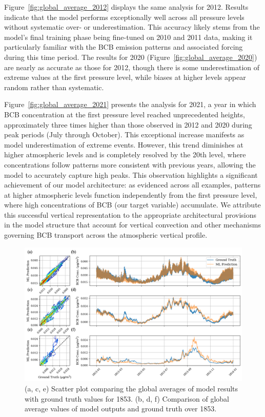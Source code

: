 \documentclass{article}
\begin{document}
    Figure~\ref{fig:global_average_2012} displays the same analysis for 2012. Results indicate that the model performs exceptionally well across all pressure levels without systematic over- or underestimation. This accuracy likely stems from the model's final training phase being fine-tuned on 2010 and 2011 data, making it particularly familiar with the BCB emission patterns and associated forcing during this time period. The results for 2020 (Figure~\ref{fig:global_average_2020}) are nearly as accurate as those for 2012, though there is some underestimation of extreme values at the first pressure level, while biases at higher levels appear random rather than systematic.
    
    Figure~\ref{fig:global_average_2021} presents the analysis for 2021, a year in which BCB concentration at the first pressure level reached unprecedented heights, approximately three times higher than those observed in 2012 and 2020 during peak periods (July through October). This exceptional increase manifests as model underestimation of extreme events. However, this trend diminishes at higher atmospheric levels and is completely resolved by the 20th level, where concentrations follow patterns more consistent with previous years, allowing the model to accurately capture high peaks. This observation highlights a significant achievement of our model architecture: as evidenced across all examples, patterns at higher atmospheric levels function independently from the first pressure level, where high concentrations of BCB (our target variable) accumulate. We attribute this successful vertical representation to the appropriate architectural provisions in the model structure that account for vertical convection and other mechanisms governing BCB transport across the atmospheric vertical profile.
    
    
    \begin{figure}[htbp]
        \centering
        \includegraphics[width=\linewidth]{global_average_1853.png}
        \caption{(a, c, e) Scatter plot comparing the global averages of model results with ground truth values for 1853. (b, d, f) Comparison of global average values of model outputs and ground truth over 1853.}
        \label{fig:global_average_1853}
    \end{figure}
\end{document}
